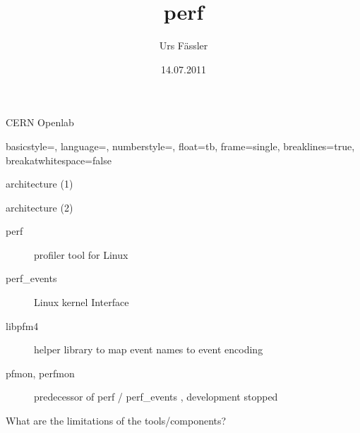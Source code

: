 
\usepackage[utf8x]{inputenc}
\usepackage{ucs}
\usepackage{amsmath}
\usepackage{amsfonts}
\usepackage{amssymb}
\usepackage{multicol}
\usepackage{graphicx}
\usepackage{tikz}
\usetikzlibrary{arrows,positioning,shapes}
\usepackage{listings}
\usepackage{multicol}
\usepackage{appendixnumberbeamer}
\usepackage{pstricks}
\usepackage{marvosym}

\newcommand{\code}[1]{\texttt{#1}}

\title{perf}
\author{Urs F\"assler}
\date{14.07.2011}
\institute
{
  CERN Openlab
}

\lstset
{  
  basicstyle=\small\ttfamily,
  language=,
  numberstyle={\color{Grey}},
  float=tb,
  frame=single,
  breaklines=true, %
  breakatwhitespace=false %
}



\beamertemplatenavigationsymbolsempty


\begin{frame}[plain]
  \titlepage
\end{frame}

\setcounter{framenumber}{0}

\begin{frame}{architecture (1)}
\centering{
  }
\end{frame}

\begin{frame}{architecture (2)}
\begin{description}
  \item[perf] profiler tool for Linux
  \item[perf\_events] Linux kernel Interface
  \item[libpfm4] helper library to map event names to event encoding
  \item[pfmon, perfmon] predecessor of perf / perf\_events , development stopped
\end{description}
\end{frame}

What are the limitations of the tools/components? 


